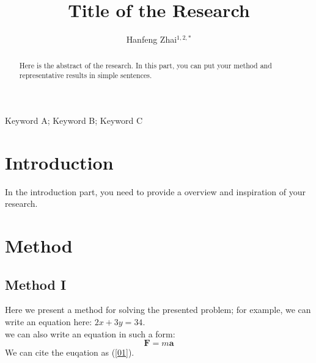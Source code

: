 \documentclass[preprint,12pt]{elsarticle}
\begin{document}
\begin{frontmatter}


\title{\textbf{Title of the Research}}


\author{Hanfeng Zhai$^{1,2,\ast}$}

\address{$^{1}$Department of Mechanics, Shanghai University, \\SHANGDA Rd., Shanghai 200444, China}
\address{$^{2}$Second Affiliation, University of Whatever, \\Address., State 000000, Country} 

\address{$^{\ast}$\rm To whom correspondence should be addressed; E-mail:  frankzhai0@gmail.com}

\begin{abstract}

Here is the abstract of the research. In this part, you can put your method and representative results in simple sentences.

\end{abstract}

\begin{keyword}Keyword A; Keyword B; Keyword C

\end{keyword}

\end{frontmatter}



\section{Introduction}

In the introduction part, you need to provide a overview and inspiration of your research.



\section{Method}
\subsection{Method I}



Here we present a method for solving the presented problem; for example, we can write an equation here:
$2x+3y=34$. \\
\indent we can also write an equation in such a form:
\begin{equation}
    \mathbf{F} = m\mathbf{a}\label{01}
    \end{equation}
\indent We can cite the euqation as (\ref*{01}).
\end{document}
